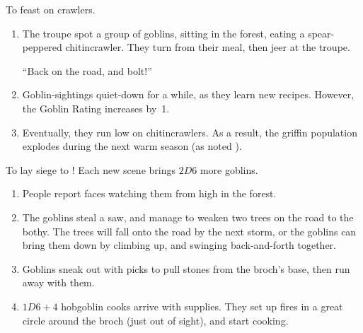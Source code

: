 \begin{multicols}{2}
\begin{dlist}
  \item
  To feast on crawlers.
  \begin{enumerate}
    \item
    The troupe spot a group of goblins, sitting in the forest, eating a spear-peppered chitincrawler.
    They turn from their meal, then jeer at the troupe.

    ``Back on the road, and bolt!''
    \item
    Goblin-sightings quiet-down for a while, as they learn new recipes.
    However, the Goblin Rating increases by~1.
    \item
    Eventually, they run low on chitincrawlers.
    As a result, the griffin population explodes during the next warm season (as noted ).
  \end{enumerate}
  \item
  To lay siege to !
  Each new scene brings $2D6$ more goblins.
  \begin{enumerate}
    \item
    People report faces watching them from high in the forest.
    \item
    The goblins steal a saw, and manage to weaken two trees on the road to the \gls{bothy}.
    The trees will fall onto the road by the next storm, or the goblins can bring them down by climbing up, and swinging back-and-forth together.
    \item
    Goblins sneak out with picks to pull stones from the \gls{broch}'s base, then run away with them.
    \item
    $1D6+4$ hobgoblin cooks arrive with supplies.
    They set up fires in a great circle around the \gls{broch} (just out of sight), and start cooking.


\end{enumerate}
\end{dlist}
\end{multicols}
